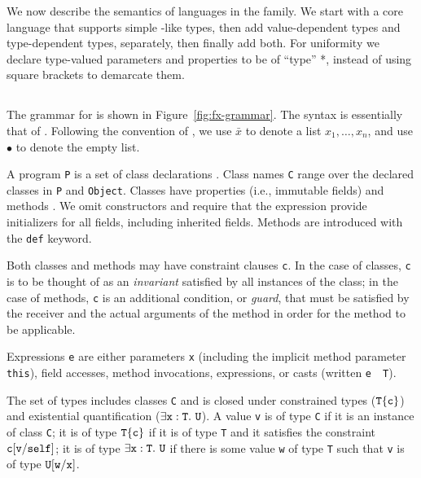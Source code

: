 

\newcommand{\constraint}{{\tt constraint}}
\newcommand\cj[2]{{#1} \vdash_{\cal W}{#2}}
\newcommand\wj[2]{{#1} \vdash_{\cal W} {#2}}
\newcommand\wjj[3]{{#1} \vdash_{\cal W} {#2},{#3}}
\newcommand\tj[3]{{#1} \vdash {#2} \ty {#3}}
\newcommand\stj[3]{{#1} \vdash {#2} \subtype {#3}}
\newcommand\ttj[2]{{#1} \vdash_{\cal W}{#2}}
\newcommand\vdashL{\vdash_{\cal L}}

We now describe the semantics of languages in the \FX{} family.
We start with a core \FXZ{} language that supports simple
\FJ-like types, then add value-dependent types and type-dependent
types, separately, then finally add both. For uniformity we declare type-valued parameters and properties to be of ``type'' *, instead of using square brackets to demarcate them.

\subsection{\FXZ}


The grammar for \FXZ{} is shown in Figure~\ref{fig:fx-grammar}.
The syntax is essentially that of \FJ{}.
Following the convention of \FJ{}, we use $\bar{x}$ to denote a
list $x_1, \dots, x_n$, and use $\bullet$ to denote the empty
list.

A program {\tt P} is a set of class declarations .
Class names {\tt C} range over the declared classes in {\tt P} 
and {\tt Object}.
Classes have
properties (i.e., immutable fields)  and methods .  We omit constructors
and require that the \new{} expression provide initializers
for all fields, including inherited fields. 
Methods are introduced with the {\tt def} keyword.

Both classes and methods may have constraint clauses
{\tt c}.  In the case of classes, {\tt c} is to be thought of as an
{\em invariant} satisfied by all instances of the class; in the case of
methods, {\tt c} is an additional condition, or {\em guard},
that must be satisfied by
the receiver 
and the actual arguments of the method in order for the method to
be applicable.

Expressions {\tt e} are either parameters {\tt x} (including the implicit
method parameter {\tt this}), field accesses, method invocations, \new{}
expressions, or casts (written {\tt e}~\as~{\tt T}).

The set of types includes classes {\tt C} and is closed under
constrained types ($\tt T\{c\}$) and existential
quantification ($\exists \tt x:T.~U$).
A value {\tt v} is of type {\tt C} if it is an instance of class {\tt C}; it is of type $\tt
T\{c\}$ if it is of type {\tt T} and it satisfies the constraint $\tt
c[v/self]$; it is of type $\exists \tt x:T.~U$
if there is some value {\tt w}
of type {\tt T} such that {\tt v} is of type
$\tt U[w/x]$.

